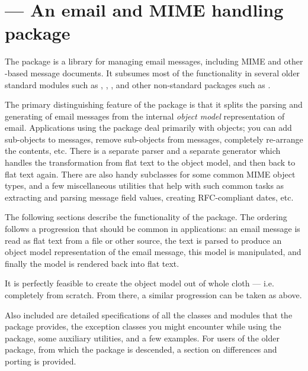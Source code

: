 
\section{ ---
	 An email and MIME handling package}



The  package is a library for managing email messages,
including MIME and other -based message documents.  It
subsumes most of the functionality in several older standard modules
such as , ,
, and other non-standard packages such as
.

The primary distinguishing feature of the  package is
that it splits the parsing and generating of email messages from the
internal \emph{object model} representation of email.  Applications
using the  package deal primarily with objects; you can
add sub-objects to messages, remove sub-objects from messages,
completely re-arrange the contents, etc.  There is a separate parser
and a separate generator which handles the transformation from flat
text to the object model, and then back to flat text again.  There
are also handy subclasses for some common MIME object types, and a few
miscellaneous utilities that help with such common tasks as extracting
and parsing message field values, creating RFC-compliant dates, etc.

The following sections describe the functionality of the
 package.  The ordering follows a progression that
should be common in applications: an email message is read as flat
text from a file or other source, the text is parsed to produce an
object model representation of the email message, this model is
manipulated, and finally the model is rendered back into
flat text.

It is perfectly feasible to create the object model out of whole cloth
--- i.e. completely from scratch.  From there, a similar progression
can be taken as above.  

Also included are detailed specifications of all the classes and
modules that the  package provides, the exception
classes you might encounter while using the  package,
some auxiliary utilities, and a few examples.  For users of the older
 package, from which the  package is
descended, a section on differences and porting is provided.

